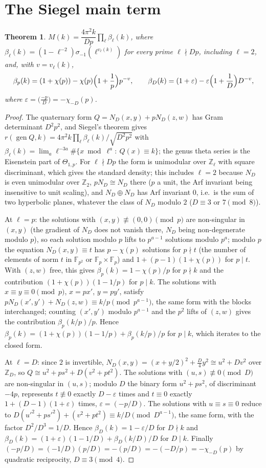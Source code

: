 \documentclass[11pt]{amsart}
\newtheorem{theorem}{Theorem}[section]
\theoremstyle{remark}
\newcommand{\Z}{\mathbb{Z}}
\newcommand{\e}{\varepsilon}
\DeclareMathOperator{\gen}{gen}
\begin{document}
\section{The Siegel main term}
\begin{theorem}\label{thm:siegel}
$M(k)=\dfrac{4\pi^2k}{Dp}\prod_\ell\beta_\ell(k)$, where $\beta_\ell(k)=(1-\ell^{-2})\sigma_{-1}(\ell^{v_\ell(k)})$ for every prime $\ell\nmid Dp$, including $\ell=2$, and, with $v=v_\ell(k)$,
\[
\beta_p(k)=(1+\chi(p))-\chi(p)\Bigl(1+\frac1p\Bigr)p^{-v},\qquad \beta_D(k)=(1+\e)-\e\Bigl(1+\frac1D\Bigr)D^{-v},
\]
where $\e=\bigl(\frac{-p}D\bigr)=-\chi_{-D}(p)$.
\end{theorem}
\begin{proof}
The quaternary form $Q=N_D(x,y)+pN_D(z,w)$ has Gram determinant $D^2p^2$, and Siegel's theorem gives $r(\gen Q,k)=4\pi^2k\prod_\ell\beta_\ell(k)/\sqrt{D^2p^2}$ with $\beta_\ell(k)=\lim_a\ell^{-3a}\#\{x\bmod\ell^a:\ Q(x)\equiv k\}$; the genus theta series is the Eisenstein part of $\Theta_{1,p}$. For $\ell\nmid Dp$ the form is unimodular over $\Z_\ell$ with square discriminant, which gives the standard density; this includes $\ell=2$ because $N_D$ is even unimodular over $\Z_2$, $pN_D\cong N_D$ there ($p$ a unit, the Arf invariant being insensitive to unit scaling), and $N_D\oplus N_D$ has Arf invariant $0$, i.e.\ is the sum of two hyperbolic planes, whatever the class of $N_D$ modulo $2$ ($D\equiv3$ or $7\pmod8$).

At $\ell=p$: the solutions with $(x,y)\not\equiv(0,0)\pmod p$ are non-singular in $(x,y)$ (the gradient of $N_D$ does not vanish there, $N_D$ being non-degenerate modulo $p$), so each solution modulo $p$ lifts to $p^{a-1}$ solutions modulo $p^a$; modulo $p$ the equation $N_D(x,y)\equiv t$ has $p-\chi(p)$ solutions for $p\nmid t$ (the number of elements of norm $t$ in $\mathbb F_{p^2}$ or $\mathbb F_p\times\mathbb F_p$) and $1+(p-1)(1+\chi(p))$ for $p\mid t$. With $(z,w)$ free, this gives $\beta_p(k)=1-\chi(p)/p$ for $p\nmid k$ and the contribution $(1+\chi(p))(1-1/p)$ for $p\mid k$. The solutions with $x\equiv y\equiv0\pmod p$, $x=px'$, $y=py'$, satisfy $pN_D(x',y')+N_D(z,w)\equiv k/p\pmod{p^{a-1}}$, the same form with the blocks interchanged; counting $(x',y')$ modulo $p^{a-1}$ and the $p^2$ lifts of $(z,w)$ gives the contribution $\beta_p(k/p)/p$. Hence $\beta_p(k)=(1+\chi(p))(1-1/p)+\beta_p(k/p)/p$ for $p\mid k$, which iterates to the closed form.

At $\ell=D$: since $2$ is invertible, $N_D(x,y)=(x+y/2)^2+\frac D4y^2\cong u^2+Dv^2$ over $\Z_D$, so $Q\cong u^2+ps^2+D(v^2+pt^2)$. The solutions with $(u,s)\not\equiv0\pmod D$ are non-singular in $(u,s)$; modulo $D$ the binary form $u^2+ps^2$, of discriminant $-4p$, represents $t\not\equiv0$ exactly $D-\e$ times and $t\equiv0$ exactly $1+(D-1)(1+\e)$ times, $\e=(-p/D)$. The solutions with $u\equiv s\equiv0$ reduce to $D(u'^2+ps'^2)+(v^2+pt^2)\equiv k/D\pmod{D^{a-1}}$, the same form, with the factor $D^2/D^3=1/D$. Hence $\beta_D(k)=1-\e/D$ for $D\nmid k$ and $\beta_D(k)=(1+\e)(1-1/D)+\beta_D(k/D)/D$ for $D\mid k$. Finally $(-p/D)=(-1/D)(p/D)=-(p/D)=-(-D/p)=-\chi_{-D}(p)$ by quadratic reciprocity, $D\equiv3\pmod4$.
\end{proof}
\end{document}
